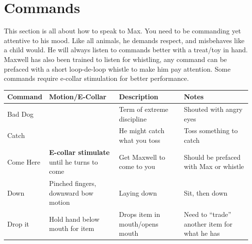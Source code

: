 \documentclass[pdftex,12pt]{article}
\begin{document}
\newpage
\section{Commands}

This section is all about how to speak to Max. You need to be commanding yet attentive to his mood.
Like all animals, he demands respect, and misbehaves like a child would.
He will always listen to commands better with a treat/toy in hand.
Maxwell has also been trained to listen for whistling, any command can be prefaced with a short loop-de-loop whistle to make him pay attention.
Some commands require e-collar stimulation for better performance.

\begin{table}[H]\label{tab:commands}
\begin{adjustwidth}{-4.5cm}{-4.5cm}
\begin{center}
\bgroup%
\def\arraystretch{1.3} %
\begin{tabular}{lp{}p{}p{}}
\rowcolor{gray!50} Command    & Motion/E-Collar                                                  & Description                                           & Notes                                                                \\
\hline
\rowcolor{white}   Bad Dog    &                                                                  & Term of extreme discipline                            & Shouted with angry eyes                                              \\
\rowcolor{gray!25} Catch      &                                                                  & He might catch what you toss                          & Toss something to catch                                              \\
\rowcolor{white}   Come Here  & \textbf{E-collar stimulate} until he turns to come               & Get Maxwell to come to you                            & Should be prefaced with Max or whistle                               \\
\rowcolor{gray!25} Down       & Pinched fingers, downward bow motion                             & Laying down                                           & Sit, then down                                                       \\
\rowcolor{white}   Drop it    & Hold hand below mouth for item                                   & Drops item in mouth/opens mouth                       & Need to ``trade'' another item for what he has                       \\

\end{tabular}
\end{center}
\end{adjustwidth}
\end{table}
\end{document}
